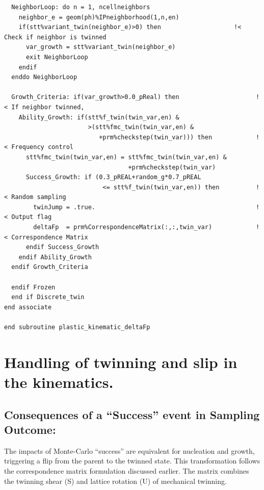 \begin{verbatim}
  NeighborLoop: do n = 1, ncellneighbors
    neighbor_e = geom(ph)%IPneighborhood(1,n,en)
    if(stt%variant_twin(neighbor_e)>0) then                    !< Check if neighbor is twinned
      var_growth = stt%variant_twin(neighbor_e)
      exit NeighborLoop
    endif
  enddo NeighborLoop

  Growth_Criteria: if(var_growth>0.0_pReal) then                     !< If neighbor twinned,
    Ability_Growth: if(stt%f_twin(twin_var,en) &
                       >(stt%fmc_twin(twin_var,en) &
                          +prm%checkstep(twin_var))) then            !< Frequency control
      stt%fmc_twin(twin_var,en) = stt%fmc_twin(twin_var,en) &
                                  +prm%checkstep(twin_var)
      Success_Growth: if (0.3_pREAL+random_g*0.7_pREAL 
                           <= stt%f_twin(twin_var,en)) then          !< Random sampling
        twinJump = .true.                                            !< Output flag
        deltaFp  = prm%CorrespondenceMatrix(:,:,twin_var)            !< Correspondence Matrix
      endif Success_Growth
    endif Ability_Growth
  endif Growth_Criteria
  
  endif Frozen
  end if Discrete_twin
end associate
  
end subroutine plastic_kinematic_deltaFp
\end{verbatim}


\section{Handling of twinning and slip in the kinematics.}

\subsection{Consequences of a “Success” event in Sampling Outcome:}
The impacts of Monte-Carlo “success” are equivalent for nucleation and growth, triggering a flip from the parent to the twinned state. This transformation follows the correspondence matrix formulation discussed earlier. The matrix combines the twinning shear (S) and lattice rotation (U) of mechanical twinning.

